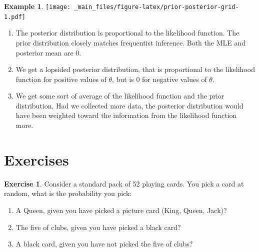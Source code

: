 \documentclass[
]{book}
\providecommand{\tightlist}{%
  \setlength{\itemsep}{0pt}\setlength{\parskip}{0pt}}
\theoremstyle{definition}
\theoremstyle{definition}
\newtheorem{example}{Example}[chapter]
\theoremstyle{definition}
\newtheorem{exercise}{Exercise}[chapter]
\theoremstyle{definition}
\theoremstyle{remark}
\begin{document}
\begin{example}
\texttt{[image: \_main\_files/figure-latex/prior-posterior-grid-1.pdf]}

\begin{enumerate}
\def\labelenumi{\arabic{enumi}.}
\item
  The posterior distribution is proportional to the likelihood function. The prior distribution closely matches frequentist inference. Both the MLE and posterior mean are 0.
\item
  We get a lopsided posterior distribution, that is proportional to the likelihood function for positive values of \(\theta\), but is 0 for negative values of \(\theta\).
\item
  We get some sort of average of the likelihood function and the prior distribution. Had we collected more data, the posterior distribution would have been weighted toward the information from the likelihood function more.
\end{enumerate}

\end{example}

\hypertarget{exercises}{%
\section{Exercises}\label{exercises}}

\begin{exercise}

Consider a standard pack of 52 playing cards. You pick a card at random, what is the probability you pick:

\begin{enumerate}
\def\labelenumi{\arabic{enumi}.}
\tightlist
\item
  A Queen, given you have picked a picture card (King, Queen, Jack)?
\item
  The five of clubs, given you have picked a black card?
\item
  A black card, given you have not picked the five of clubs?
\end{enumerate}

\end{exercise}
\end{document}

